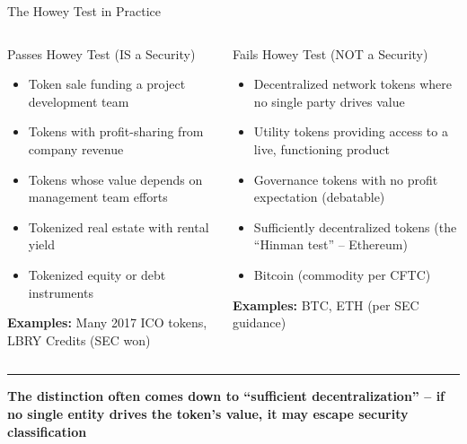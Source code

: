 \documentclass[8pt,aspectratio=169]{beamer}
\newcommand{\bottomnote}[1]{\vfill\vspace{-2mm}\textcolor{mllavender2}{\rule{\textwidth}{0.4pt}}\vspace{1mm}\footnotesize\textbf{#1}}
\begin{document}
\begin{frame}{The Howey Test in Practice}
\begin{columns}[T]
\begin{block}{\color{mlred}Passes Howey Test (IS a Security)}
\footnotesize
\begin{itemize}
  \item Token sale funding a project development team
  \item Tokens with profit-sharing from company revenue
  \item Tokens whose value depends on management team efforts
  \item Tokenized real estate with rental yield
  \item Tokenized equity or debt instruments
\end{itemize}
\vspace{2mm}
\scriptsize
\textbf{Examples:} Many 2017 ICO tokens, LBRY Credits (SEC won)
\end{block}

\begin{block}{\color{mlgreen}Fails Howey Test (NOT a Security)}
\footnotesize
\begin{itemize}
  \item Decentralized network tokens where no single party drives value
  \item Utility tokens providing access to a live, functioning product
  \item Governance tokens with no profit expectation (debatable)
  \item Sufficiently decentralized tokens (the ``Hinman test'' -- Ethereum)
  \item Bitcoin (commodity per CFTC)
\end{itemize}
\vspace{2mm}
\scriptsize
\textbf{Examples:} BTC, ETH (per SEC guidance)
\end{block}
\end{columns}

\vspace{3mm}
\begin{center}
\end{center}
\bottomnote{The distinction often comes down to ``sufficient decentralization'' -- if no single entity drives the token's value, it may escape security classification}
\end{frame}
\end{document}
